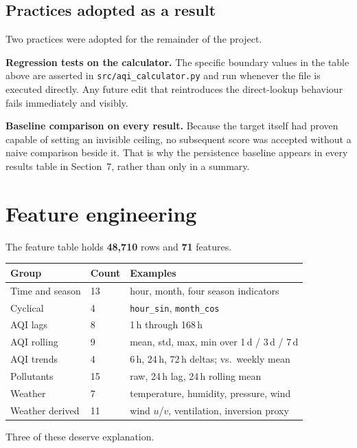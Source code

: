 \documentclass[11pt,a4paper]{article}
\begin{document}
\subsection{Practices adopted as a result}

Two practices were adopted for the remainder of the project.

\textbf{Regression tests on the calculator.} The specific boundary
values in the table above are asserted in
\texttt{src/aqi\_calculator.py} and run whenever the file is executed
directly. Any future edit that reintroduces the direct-lookup behaviour
fails immediately and visibly.

\textbf{Baseline comparison on every result.} Because the target itself
had proven capable of setting an invisible ceiling, no subsequent score
was accepted without a naive comparison beside it. That is why the
persistence baseline appears in every results table in Section~7, rather
than only in a summary.

\section{Feature engineering}

The feature table holds \textbf{48,710} rows and \textbf{71} features.

\begin{center}
\small
\begin{tabular}{lll}
\toprule
\textbf{Group} & \textbf{Count} & \textbf{Examples} \\
\midrule
Time and season & 13 & hour, month, four season indicators \\
Cyclical & 4 & \texttt{hour\_sin}, \texttt{month\_cos} \\
AQI lags & 8 & 1\,h through 168\,h \\
AQI rolling & 9 & mean, std, max, min over 1\,d / 3\,d / 7\,d \\
AQI trends & 4 & 6\,h, 24\,h, 72\,h deltas; vs.\ weekly mean \\
Pollutants & 15 & raw, 24\,h lag, 24\,h rolling mean \\
Weather & 7 & temperature, humidity, pressure, wind \\
Weather derived & 11 & wind $u$/$v$, ventilation, inversion proxy \\
\bottomrule
\end{tabular}
\end{center}

Three of these deserve explanation.
\end{document}

